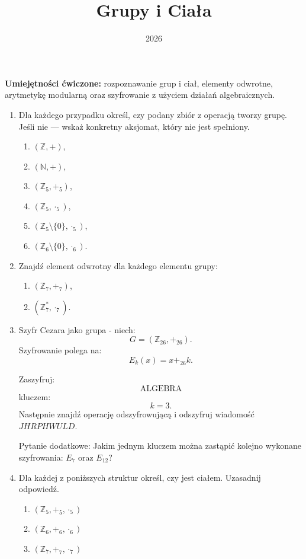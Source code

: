 \documentclass{article}
\title{Grupy i Ciała}
\date{2026}
\begin{document}
\maketitle

\begin{center}
\textbf{Umiejętności ćwiczone:} rozpoznawanie grup i ciał, elementy odwrotne, arytmetykę modularną oraz szyfrowanie z użyciem działań algebraicznych.
\end{center}



\begin{enumerate}
    \item Dla każdego przypadku określ, czy podany zbiór z operacją tworzy
    grupę.
    Jeśli nie — wskaż konkretny aksjomat, który nie jest spełniony.
    \begin{enumerate}
        \item $(\mathbb Z,+)$,
        \item $(\mathbb N,+)$,
        \item $(\mathbb Z_5,+_5)$,
        \item $(\mathbb Z_5,\cdot_5)$,
        \item $(\mathbb Z_5\setminus\{0\},\cdot_5)$,
        \item $(\mathbb Z_6\setminus\{0\},\cdot_6)$.
    \end{enumerate}

    \item Znajdź element odwrotny dla każdego elementu grupy:
    \begin{enumerate}
        \item $(\mathbb Z_7,+_7)$,
        \item $(\mathbb Z_7^*,\cdot_7)$.
    \end{enumerate}

    \item Szyfr Cezara jako grupa - niech:
    \[ G=(\mathbb Z_{26},+_{26}). \]
    Szyfrowanie polega na:
    \[ E_k(x)=x+_{26}k. \]

    Zaszyfruj:
    \[ \text{ALGEBRA} \]
    kluczem:
    $$k=3.$$
    Następnie znajdź operację odszyfrowującą i odszyfruj wiadomość $JHRPHWULD$.

    Pytanie dodatkowe:
    Jakim jednym kluczem można zastąpić kolejno wykonane szyfrowania:
    $E_7$ oraz $E_{12}$?


    \item Dla każdej z poniższych struktur określ, czy jest ciałem. Uzasadnij odpowiedź.
    \begin{enumerate}
        \item $(\mathbb Z_5,+_5,\cdot_5)$
        \item $(\mathbb Z_6,+_6,\cdot_6)$
        \item $(\mathbb Z_7,+_7,\cdot_7)$
    \end{enumerate}


\end{enumerate}
\end{document}
